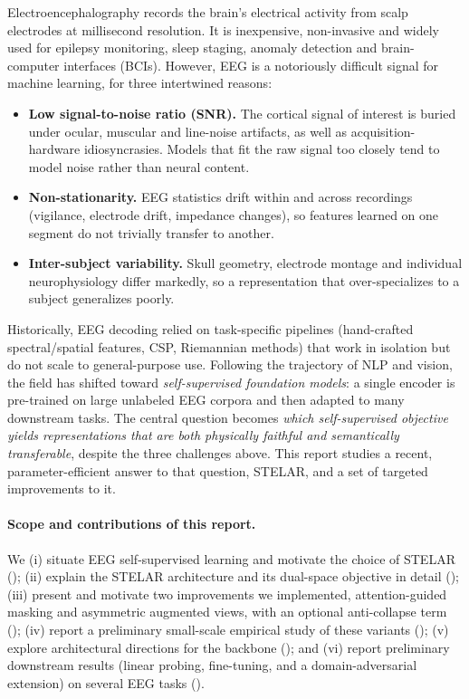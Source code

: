 \documentclass[11pt]{article}
\begin{document}
Electroencephalography records the brain's electrical activity from scalp
electrodes at millisecond resolution. It is inexpensive, non-invasive and widely
used for epilepsy monitoring, sleep staging, anomaly detection and
brain-computer interfaces (BCIs). However, EEG is a notoriously difficult signal
for machine learning, for three intertwined reasons:

\begin{itemize}
  \item \textbf{Low signal-to-noise ratio (SNR).} The cortical signal of interest
  is buried under ocular, muscular and line-noise artifacts, as well as
  acquisition-hardware idiosyncrasies. Models that fit the raw signal too closely
  tend to model noise rather than neural content.
  \item \textbf{Non-stationarity.} EEG statistics drift within and across
  recordings (vigilance, electrode drift, impedance changes), so features learned
  on one segment do not trivially transfer to another.
  \item \textbf{Inter-subject variability.} Skull geometry, electrode montage and
  individual neurophysiology differ markedly, so a representation that
  over-specializes to a subject generalizes poorly.
\end{itemize}

Historically, EEG decoding relied on task-specific pipelines (hand-crafted
spectral/spatial features, CSP, Riemannian methods) that work in isolation but do
not scale to general-purpose use. Following the trajectory of NLP and vision, the
field has shifted toward \emph{self-supervised foundation models}: a single
encoder is pre-trained on large unlabeled EEG corpora and then adapted to many
downstream tasks. The central question becomes \emph{which self-supervised
objective yields representations that are both physically faithful and
semantically transferable}, despite the three challenges above. This report
studies a recent, parameter-efficient answer to that question, STELAR, and a
set of targeted improvements to it.

\paragraph{Scope and contributions of this report.} We (i) situate EEG
self-supervised learning and motivate the choice of STELAR
(); (ii) explain the STELAR architecture and its dual-space
objective in detail (); (iii) present and motivate two
improvements we implemented, attention-guided masking and asymmetric augmented
views, with an optional anti-collapse term (); (iv) report
a preliminary small-scale empirical study of these variants
(); (v) explore architectural directions for the backbone
(); and (vi) report preliminary downstream results
(linear probing, fine-tuning, and a domain-adversarial extension) on several
EEG tasks ().
\end{document}
